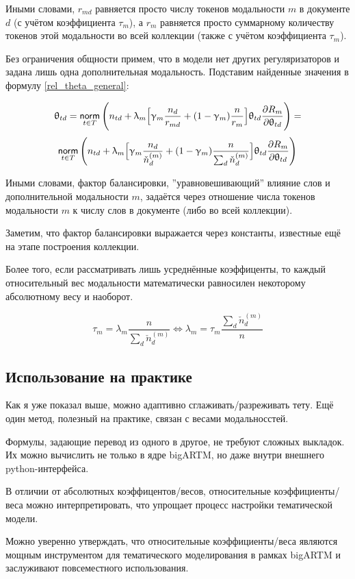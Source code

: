 Иными словами, $r_{md}$ равняется просто числу токенов модальности $m$ в документе $d$ (с учётом коэффициента $\tau_m$), а $r_m$ равняется просто суммарному количеству токенов этой модальности во всей коллекции (также с учётом коэффициента $\tau_m$).

Без ограничения общности примем, что в модели нет других регуляризаторов и задана лишь одна дополнительная модальность. Подставим найденные значения в формулу \ref{rel_theta_general}:

\[
\uptheta_{td} = \mathop{\mathsf{norm}}\limits_{t \in T} \Bigg( 
    n_{td} + \uplambda_m \Big[
        \upgamma_m \frac{n_d}{r_{md}} + (1-\upgamma_m)\frac{n}{r_m}
        \Big] 
    \uptheta_{td} \frac{\partial R_m}{\partial \uptheta_{td}}
\Bigg) = 
\]
\[
\mathop{\mathsf{norm}}\limits_{t \in T} \Bigg( 
    n_{td} + \uplambda_m \Big[
        \upgamma_m \frac{n_d}{\check{n}_d^{(m)}} + (1-\upgamma_m)\frac{n}{\sum_d \check{n}_d^{(m)}}
        \Big] 
    \uptheta_{td} \frac{\partial R_m}{\partial \uptheta_{td}}
\Bigg)
\]

Иными словами, фактор балансировки, ''уравновешивающий'' влияние слов и дополнительной модальности $m$, задаётся через отношение числа токенов модальности $m$ к числу слов в документе (либо во всей коллекции).

Заметим, что фактор балансировки выражается через константы, известные ещё на этапе построения коллекции.

Более того, если рассматривать лишь усреднённые коэффиценты, то каждый относительный вес модальности математически равносилен некоторому абсолютному весу и наоборот.

\[
\tau_m = \lambda_m \frac{n}{\sum_d \check{n}_d^{(m)}} \iff 
\lambda_m = \tau_m \frac{\sum_d \check{n}_d^{(m)}}{n}
\]


\subsection{Использование на практике}

Как я уже показал выше, можно адаптивно сглаживать/разреживать тету. Ещё один метод, полезный на практике, связан с весами модальносстей.

Формулы, задающие перевод из одного в другое, не требуют сложных выкладок. Их можно вычислить не только в ядре bigARTM, но даже внутри внешнего python-интерфейса.

В отличии от абсолютных коэффицентов/весов, 
относительные коэффициенты/веса можно интерпретировать, что упрощает процесс настройки тематической модели.

Можно уверенно утверждать, что относительные коэффициенты/веса являются мощным инструментом для тематического моделирования в рамках bigARTM и заслуживают повсеместного использования. 

